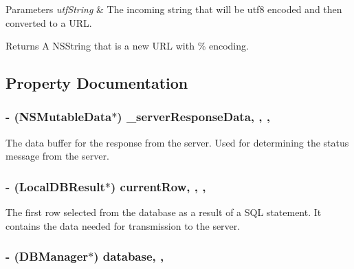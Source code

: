 \begin{DoxyParams}{Parameters}
{\em utf\-String} & The incoming string that will be utf8 encoded and then converted to a U\-R\-L.\\
\hline
\end{DoxyParams}
\begin{DoxyReturn}{Returns}
A N\-S\-String that is a new U\-R\-L with \% encoding. 
\end{DoxyReturn}


\subsection{Property Documentation}
\hypertarget{interface_remote_d_b_connection_manager_a6956166be867026a4ed5c9552c2fbc85}{
\subsubsection[{\-\_\-server\-Response\-Data}]{\setlength{\rightskip}{0pt plus 5cm}-\/ (N\-S\-Mutable\-Data$\ast$) \-\_\-server\-Response\-Data\hspace{0.3cm}{\ttfamily [read]}, {\ttfamily [write]}, {\ttfamily [atomic]}, {\ttfamily [retain]}}}\label{interface_remote_d_b_connection_manager_a6956166be867026a4ed5c9552c2fbc85}
The data buffer for the response from the server. Used for determining the status message from the server. \hypertarget{interface_remote_d_b_connection_manager_a1cf642f7f159dedf3f805ae62f86f0ee}{
\subsubsection[{current\-Row}]{\setlength{\rightskip}{0pt plus 5cm}-\/ ({\bf Local\-D\-B\-Result}$\ast$) current\-Row\hspace{0.3cm}{\ttfamily [read]}, {\ttfamily [write]}, {\ttfamily [nonatomic]}, {\ttfamily [assign]}}}\label{interface_remote_d_b_connection_manager_a1cf642f7f159dedf3f805ae62f86f0ee}
The first row selected from the database as a result of a S\-Q\-L statement. It contains the data needed for transmission to the server. \hypertarget{interface_remote_d_b_connection_manager_aea31c73a0a3e36095f04688a9b51b594}{
\subsubsection[{database}]{\setlength{\rightskip}{0pt plus 5cm}-\/ ({\bf D\-B\-Manager}$\ast$) database\hspace{0.3cm}{\ttfamily [read]}, {\ttfamily [write]}, {\ttfamily [atomic]}}}\label{interface_remote_d_b_connection_manager_aea31c73a0a3e36095f04688a9b51b594}
